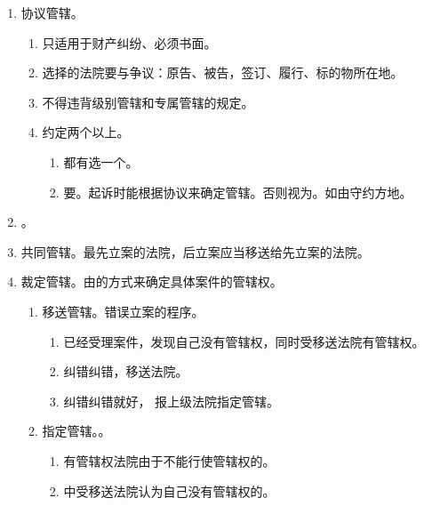 \begin{enumerate}
\begin{enumerate}
          \item 港口作业 \yjt 港口所在地。
          \item 遗产继承 \yjt 被继承人死亡时住所地和主要遗产所在地。
        \end{enumerate}
  \item 协议管辖。
        \begin{enumerate}
          \item 只适用于财产纠纷、必须书面。
          \item 选择的法院要与争议：原告、被告，签订、履行、标的物所在地。
          \item 不得违背级别管辖和专属管辖的规定。
          \item 约定两个以上。
                \begin{enumerate}
                  \item 都有选一个。
                  \item 要。起诉时能根据协议来确定管辖。否则视为。如由守约方地。
                \end{enumerate}
        \end{enumerate}
  \item {}。
  \item 共同管辖。最先立案的法院，后立案应当移送给先立案的法院。
  \item 裁定管辖。由的方式来确定具体案件的管辖权。
        \begin{enumerate}
          \item 移送管辖。错误立案的程序。
                \begin{enumerate}
                  \item 已经受理案件，发现自己没有管辖权，同时受移送法院有管辖权。
                  \item 纠错纠错，移送法院。
                  \item 纠错纠错就好， \yjt 报上级法院指定管辖。
                \end{enumerate}
          \item 指定管辖。。
                \begin{enumerate}
                  \item 有管辖权法院由于不能行使管辖权的。
                  \item {}中受移送法院认为自己没有管辖权的。

\end{enumerate}
\end{enumerate}
\end{enumerate}
